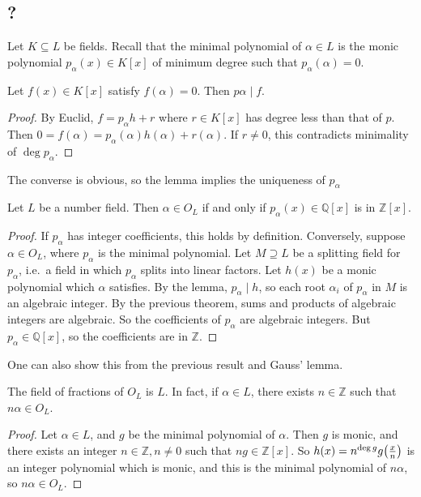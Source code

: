 \subsection{?}
Let \( K \subseteq L \) be fields.
Recall that the minimal polynomial of \( \alpha \in L \) is the monic polynomial \( p_\alpha(x) \in K[x] \) of minimum degree such that \( p_\alpha(\alpha) = 0 \).
\begin{lemma}
    Let \( f(x) \in K[x] \) satisfy \( f(\alpha) = 0 \).
    Then \( p\alpha \mid f \).
\end{lemma}
\begin{proof}
    By Euclid, \( f = p_\alpha h + r \) where \( r \in K[x] \) has degree less than that of \( p \).
    Then \( 0 = f(\alpha) = p_\alpha(\alpha) h(\alpha) + r(\alpha) \).
    If \( r \neq 0 \), this contradicts minimality of \( \deg p_\alpha \).
\end{proof}
The converse is obvious, so the lemma implies the uniqueness of \( p_\alpha \)
\begin{proposition}
    Let \( L \) be a number field.
    Then \( \alpha \in O_L \) if and only if \( p_\alpha(x) \in \mathbb Q[x] \) is in \( \mathbb Z[x] \).
\end{proposition}
\begin{proof}
    If \( p_\alpha \) has integer coefficients, this holds by definition.
    Conversely, suppose \( \alpha \in O_L \), where \( p_\alpha \) is the minimal polynomial.
    Let \( M \supseteq L \) be a splitting field for \( p_\alpha \), i.e.\, a field in which \( p_\alpha \) splits into linear factors.
    Let \( h(x) \) be a monic polynomial which \( \alpha \) satisfies.
    By the lemma, \( p_\alpha \mid h \), so each root \( \alpha_i \) of \( p_\alpha \) in \( M \) is an algebraic integer.
    By the previous theorem, sums and products of algebraic integers are algebraic.
    So the coefficients of \( p_\alpha \) are algebraic integers.
    But \( p_\alpha \in \mathbb Q[x] \), so the coefficients are in \( \mathbb Z \).
\end{proof}
\begin{remark}
    One can also show this from the previous result and Gauss' lemma.
\end{remark}
\begin{lemma}
    The field of fractions of \( O_L \) is \( L \).
    In fact, if \( \alpha \in L \), there exists \( n \in \mathbb Z \) such that \( n\alpha \in O_L \).
\end{lemma}
\begin{proof}
    Let \( \alpha \in L \), and \( g \) be the minimal polynomial of \( \alpha \).
    Then \( g \) is monic, and there exists an integer \( n \in \mathbb Z, n \neq 0 \) such that \( ng \in \mathbb Z[x] \).
    So \( h(x) = n^{\deg g} g\qty(\frac{x}{n}) \) is an integer polynomial which is monic, and this is the minimal polynomial of \( n\alpha \), so \( n\alpha \in O_L \).
\end{proof}


